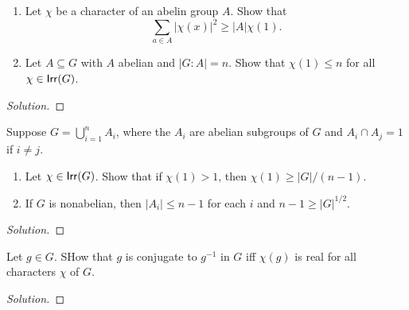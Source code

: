\newpage
\begin{problem}[2.9]

\begin{enumerate}[font=\normalfont,label=\textbf{(\Alph*)}]
  \item Let $\chi$ be a character of an abelin group $A$. Show that
  \[
    \sum_{a \in A} \lvert \chi(x)\rvert^2 \geq \lvert A \rvert \chi(1).
  \]
  \item Let $A\subseteq G$ with $A$ abelian and $\lvert G : A \rvert = n$. Show that $\chi(1) \leq n$ for all $\chi \in \mathsf{Irr}(G)$.
\end{enumerate}
\end{problem}

\begin{proof}[Solution]

\end{proof}

\newpage
\begin{problem}[2.10]
Suppose $G = \bigcup_{i=1}^n A_i$, where the $A_i$ are abelian subgroups of $G$ and $A_i \cap A_j = 1$ if $i \neq j$.

\begin{enumerate}[font=\normalfont,label=\textbf{(\Alph*)}]
  \item Let $\chi \in \mathsf{Irr}(G)$. Show that if $\chi(1) > 1$, then $\chi(1) \geq \lvert G \rvert /(n-1)$.
  \item If $G$ is nonabelian, then $\lvert A_i \rvert \leq n-1$ for each $i$ and $n-1 \geq \lvert G \rvert^{1/2}$.
\end{enumerate}
\end{problem}

\begin{proof}[Solution]

\end{proof}

\newpage
\begin{problem}[2.11]
Let $g\in G$. SHow that $g$ is conjugate to $g^{-1}$ in $G$ iff $\chi(g)$ is real for all characters $\chi$ of $G$.
\end{problem}

\begin{proof}[Solution]

\end{proof}


